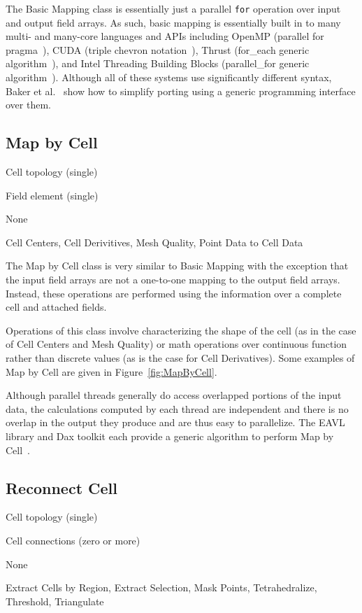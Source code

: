 \documentclass{sig-alternate}
\newcommand*{\lcite}[1]{~\cite{#1}}
\newcommand*{\scite}[1]{~\cite{#1}}
\newcommand{\etal}{et al.}
\newcommand{\algclass}[1]{\textsf{#1}}
\newcommand{\alg}[1]{#1}
\newcommand{\algorithmclasssection}[1]{\subsection*{#1}}
\newcommand{\algorithmclass}[5]{
  \algorithmclasssection{#1} %
  \begin{description}[leftmargin=9em,style=nextline,noitemsep]
    \raggedright
  \item[Input] #2
  \item[Output] #3
  \item[Interdependence] #4
  \item[Algorithms] #5
  \end{description}
}
\begin{document}
The \algclass{Basic Mapping} class is essentially just a parallel
\texttt{for} operation over input and output field arrays. As such, basic
mapping is essentially built in to many multi- and many-core languages and
APIs including OpenMP (parallel for pragma\lcite{Quinn2004}), CUDA (triple
chevron notation\lcite{Sanders2011}), Thrust (for\_each generic
algorithm\lcite{Thrust}), and Intel Threading Building Blocks
(parallel\_for generic algorithm\lcite{TBB}). Although all of these systems
use significantly different syntax, Baker \etal\scite{Baker2010} show how
to simplify porting using a generic programming interface over them.


\algorithmclass{Map by Cell}
               {Cell topology (single)} %
               {Field element (single)} %
               {None} %
               {
                 Cell Centers,
                 Cell Derivitives,
                 Mesh Quality,
                 Point Data to Cell Data
               }

\noindent
The \algclass{Map by Cell} class is very similar to \algclass{Basic
  Mapping} with the exception that the input field arrays are not a
one-to-one mapping to the output field arrays. Instead, these operations
are performed using the information over a complete cell and attached
fields.

Operations of this class involve characterizing the shape of the cell (as
in the case of \alg{Cell Centers} and \alg{Mesh Quality}) or math
operations over continuous function rather than discrete values (as is the
case for \alg{Cell Derivatives}). Some examples of \algclass{Map by Cell}
are given in Figure~\ref{fig:MapByCell}.

Although parallel threads generally do access overlapped portions of the
input data, the calculations computed by each thread are independent and
there is no overlap in the output they produce and are thus easy to
parallelize. The EAVL library and Dax toolkit each provide a generic
algorithm to perform \algclass{Map by Cell}\lcite{EAVL,Moreland2011:LDAV}.


\algorithmclass{Reconnect Cell}
               {Cell topology (single)} %
               {Cell connections (zero or more)} %
               {None} %
               {
                 Extract Cells by Region,
                 Extract Selection,
                 Mask Points,
                 Tetrahedralize,
                 Threshold,
                 Triangulate
               }
\end{document}
